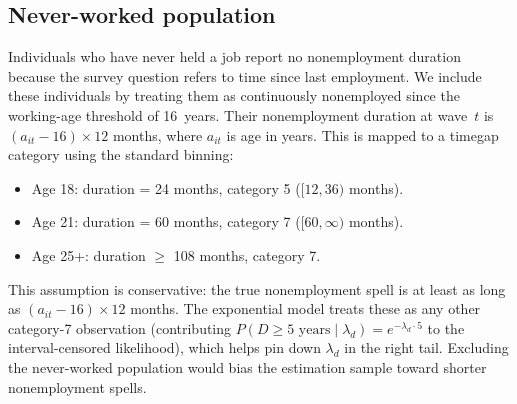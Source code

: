 \documentclass[12pt]{article}
\begin{document}
\subsection{Never-worked population}

Individuals who have never held a job report no nonemployment duration because the survey question refers to time since last employment. We include these individuals by treating them as continuously nonemployed since the working-age threshold of 16~years. Their nonemployment duration at wave~\(t\) is \((a_{it} - 16)\times 12\) months, where \(a_{it}\) is age in years. This is mapped to a timegap category using the standard binning:
\begin{itemize}
\item Age 18: duration = 24 months, category 5 (\([12,36)\) months).
\item Age 21: duration = 60 months, category 7 (\([60,\infty)\) months).
\item Age 25+: duration \(\ge\) 108 months, category 7.
\end{itemize}
This assumption is conservative: the true nonemployment spell is at least as long as \((a_{it} - 16)\times 12\) months. The exponential model treats these as any other category-7 observation (contributing \(P(D\ge 5\text{ years}\mid\lambda_d) = e^{-\lambda_d\cdot 5}\) to the interval-censored likelihood), which helps pin down \(\lambda_d\) in the right tail. Excluding the never-worked population would bias the estimation sample toward shorter nonemployment spells.

\newpage
\end{document}
